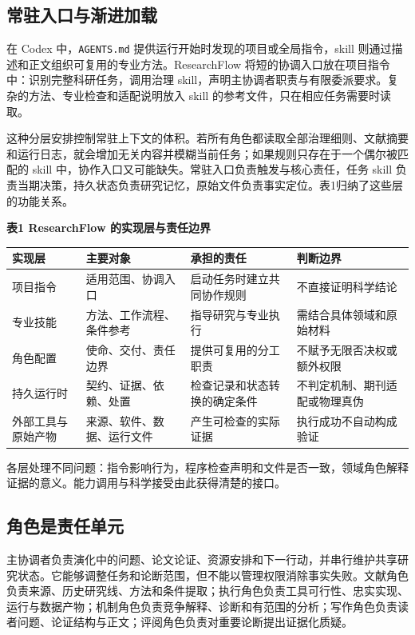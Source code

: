\documentclass[UTF8,fontset=fandol,a4paper,11pt]{ctexart}
\begin{document}
\subsection{常驻入口与渐进加载}

在 Codex 中，\texttt{AGENTS.md} 提供运行开始时发现的项目或全局指令，skill 则通过描述和正文组织可复用的专业方法\cite{r6,r7}。ResearchFlow 将短的协调入口放在项目指令中：识别完整科研任务，调用治理 skill，声明主协调者职责与有限委派要求。复杂的方法、专业检查和适配说明放入 skill 的参考文件，只在相应任务需要时读取。

这种分层安排控制常驻上下文的体积。若所有角色都读取全部治理细则、文献摘要和运行日志，就会增加无关内容并模糊当前任务；如果规则只存在于一个偶尔被匹配的 skill 中，协作入口又可能缺失。常驻入口负责触发与核心责任，任务 skill 负责当期决策，持久状态负责研究记忆，原始文件负责事实定位。表1归纳了这些层的功能关系。

\textbf{表1 ResearchFlow 的实现层与责任边界}

\begin{center}
\small
\begin{tabularx}{\textwidth}{>{\raggedright\arraybackslash}X>{\raggedright\arraybackslash}X>{\raggedright\arraybackslash}X>{\raggedright\arraybackslash}X}
\toprule
实现层 & 主要对象 & 承担的责任 & 判断边界 \\
\midrule
项目指令 & 适用范围、协调入口 & 启动任务时建立共同协作规则 & 不直接证明科学结论 \\
专业技能 & 方法、工作流程、条件参考 & 指导研究与专业执行 & 需结合具体领域和原始材料 \\
角色配置 & 使命、交付、责任边界 & 提供可复用的分工职责 & 不赋予无限否决权或额外权限 \\
持久运行时 & 契约、证据、依赖、处置 & 检查记录和状态转换的确定条件 & 不判定机制、期刊适配或物理真伪 \\
外部工具与原始产物 & 来源、软件、数据、运行文件 & 产生可检查的实际证据 & 执行成功不自动构成验证 \\
\bottomrule
\end{tabularx}
\end{center}

各层处理不同问题：指令影响行为，程序检查声明和文件是否一致，领域角色解释证据的意义。能力调用与科学接受由此获得清楚的接口。

\subsection{角色是责任单元}

主协调者负责演化中的问题、论文论证、资源安排和下一行动，并串行维护共享研究状态。它能够调整任务和论断范围，但不能以管理权限消除事实失败。文献角色负责来源、历史研究线、方法和条件提取；执行角色负责工具可行性、忠实实现、运行与数据产物；机制角色负责竞争解释、诊断和有范围的分析；写作角色负责读者问题、论证结构与正文；评阅角色负责对重要论断提出证据化质疑。
\end{document}
